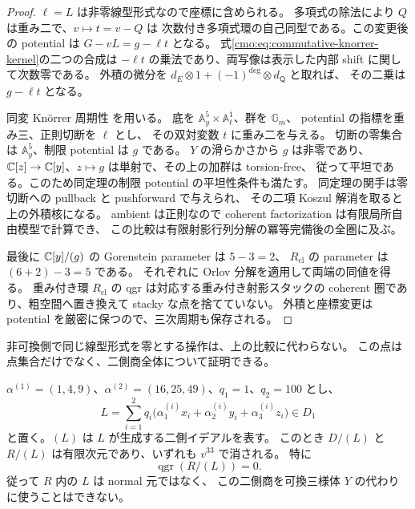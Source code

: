 \begin{proof}
$\ell=L$ は非零線型形式なので座標に含められる。
多項式の除法により $Q$ は重み二で、$v\mapsto t=v-Q$ は
次数付き多項式環の自己同型である。この変更後の potential は
$G-vL=g-\ell t$ となる。
式\eqref{cmo:eq:commutative-knorrer-kernel}の二つの合成は
$-\ell t$ の乗法であり、両写像は表示した内部 shift に関して次数零である。
外積の微分を $d_E\otimes1+(-1)^{\deg} \otimes d_{\mathsf Q}$ と取れば、
その二乗は $g-\ell t$ となる。

同変 Kn\"orrer 周期性 \cite[Theorem~1.2]{CMOHiranoKnorrer}を用いる。
底を $\mathbb A^5_y\times\mathbb A^1_\ell$、群を $\mathbb G_m$、
potential の指標を重み三、正則切断を $\ell$ とし、
その双対変数 $t$ に重み二を与える。
切断の零集合は $\mathbb A^5_y$、制限 potential は $g$ である。
$Y$ の滑らかさから $g$ は非零であり、
$\mathbb C[z]\to\mathbb C[y]$、$z\mapsto g$ は単射で、その上の加群は torsion-free、
従って平坦である。このため同定理の制限 potential の平坦性条件も満たす。
同定理の関手は零切断への pullback と pushforward で与えられ、
その二項 Koszul 解消を取ると上の外積核になる。
ambient は正則なので coherent factorization は有限局所自由模型で計算でき、
この比較は有限射影行列分解の冪等完備後の全圏に及ぶ。

最後に $\mathbb C[y]/(g)$ の Gorenstein parameter は $5-3=2$、
$R_{\mathrm{cl}}$ の parameter は $(6+2)-3=5$ である。
それぞれに Orlov 分解を適用して両端の同値を得る。
重み付き環 $R_{\mathrm{cl}}$ の qgr は対応する重み付き射影スタックの
coherent 圏であり、粗空間へ置き換えて stacky な点を捨てていない。
外積と座標変更は potential を厳密に保つので、三次周期も保存される。
\end{proof}

非可換側で同じ線型形式を零とする操作は、上の比較に代わらない。
この点は点集合だけでなく、二側商全体について証明できる。

\begin{proposition}[指定混合不変環の線型二側商]
\label{cmo:prop:invariant-linear-quotient-finite}
$\alpha^{(1)}=(1,4,9)$、$\alpha^{(2)}=(16,25,49)$、$q_1=1$、$q_2=100$ とし、
\[
 L=\sum_{i=1}^2q_i\bigl(
   \alpha^{(i)}_1x_i+\alpha^{(i)}_2y_i+\alpha^{(i)}_3z_i\bigr)\in D_1
\]
と置く。$(L)$ は $L$ が生成する二側イデアルを表す。
このとき $D/(L)$ と $R/(L)$ は有限次元であり、いずれも $v^{33}$ で消される。
特に
\begin{equation}\label{cmo:eq:invariant-linear-empty-qgr}
 \operatorname{qgr}(R/(L))=0.
\end{equation}
従って $R$ 内の $L$ は normal 元ではなく、
この二側商を可換三様体 $Y$ の代わりに使うことはできない。
\end{proposition}

